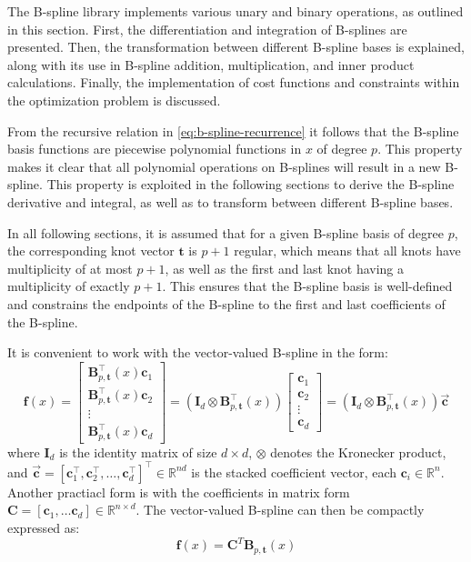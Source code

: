 The B-spline library implements various unary and binary operations, as outlined in this section. First, the differentiation and integration of B-splines are presented. Then, the transformation between different B-spline bases is explained, along with its use in B-spline addition, multiplication, and inner product calculations. Finally, the implementation of cost functions and constraints within the optimization problem is discussed.


From the recursive relation in \cref{eq:b-spline-recurrence} it follows that the B-spline basis functions are piecewise polynomial functions in $x$ of degree $p$. This property makes it clear that all polynomial operations on B-splines will result in a new B-spline. This property is exploited in the following sections to derive the B-spline derivative and integral, as well as to transform between different B-spline bases.

In all following sections, it is assumed that for a given B-spline basis of degree $p$, the corresponding knot vector $\mathbf t$ is $p+1$ regular, which means that all knots have multiplicity of at most $p+1$, as well as the first and last knot having a multiplicity of exactly $p+1$. This ensures that the B-spline basis is well-defined and constrains the endpoints of the B-spline to the first and last coefficients of the B-spline.


It is convenient to work with the vector-valued B-spline in the form:
\begin{equation}\label{eq:b-spline-vector-valued}
    \mathbf f(x) = \begin{bmatrix}
        \mathbf{B}_{p, \mathbf{t}}^\top(x) \mathbf c_1 \\
        \mathbf{B}_{p, \mathbf{t}}^\top(x) \mathbf c_2 \\
        \vdots \\
        \mathbf{B}_{p, \mathbf{t}}^\top(x) \mathbf c_d
    \end{bmatrix}
    = 
    (\mathbf{I}_d \otimes \mathbf{B}_{p, \mathbf{t}}^\top(x)) 
    \begin{bmatrix}
        \mathbf c_1 \\
        \mathbf c_2 \\
        \vdots \\
        \mathbf c_d
    \end{bmatrix} 
    = (\mathbf{I}_d \otimes \mathbf{B}_{p, \mathbf{t}}^\top(x)) \mathbf{\vec c}
\end{equation}
where $\mathbf{I}_d$ is the identity matrix of size $d\times d$, $\otimes$ denotes the Kronecker product, and $\mathbf{\vec c} = [\mathbf c_1^\top, \mathbf c_2^\top, \ldots, \mathbf c_d^\top]^\top\in\mathbb R^{nd}$ is the stacked coefficient vector, each $\mathbf c_i \in \mathbb R^n$. Another practiacl form is with the coefficients in matrix form $\mathbf C = [\mathbf c_1, \ldots \mathbf c_d]\in \mathbb R^{n \times d}$.  The vector-valued B-spline can then be compactly expressed as:
\begin{equation}\label{eq:b-spline-vector-valued-matrix}
    \mathbf f(x) = \mathbf C^T \mathbf B_{p, \mathbf{t}}(x) 
\end{equation}


